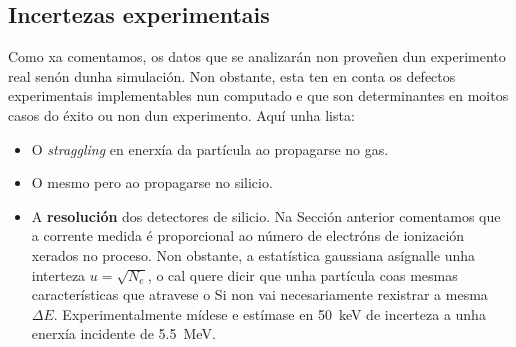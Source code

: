 \documentclass[11pt, a4paper]{article}
\begin{document}
\subsection{Incertezas experimentais}
Como xa comentamos, os datos que se analizarán non proveñen dun experimento real senón dunha simulación. Non obstante, esta ten en conta os defectos experimentais implementables nun computado e que son determinantes en moitos casos do éxito ou non dun experimento. Aquí unha lista:
\begin{itemize}
    \item O \textit{straggling} en enerxía da partícula ao propagarse no gas.
    \item O mesmo pero ao propagarse no silicio.
    \item A \textbf{resolución} dos detectores de silicio. Na Sección anterior comentamos que a corrente medida é proporcional ao número de electróns de ionización xerados no proceso. Non obstante, a estatística gaussiana asígnalle unha interteza $u = \sqrt{N_e}$, o cal quere dicir que unha partícula coas mesmas características que atravese o Si non vai necesariamente rexistrar a mesma $\Delta E$. Experimentalmente mídese e estímase en \qty{50}{\keV} de incerteza a unha enerxía incidente de \qty{5.5}{\MeV}.
\end{itemize}

\end{document}
